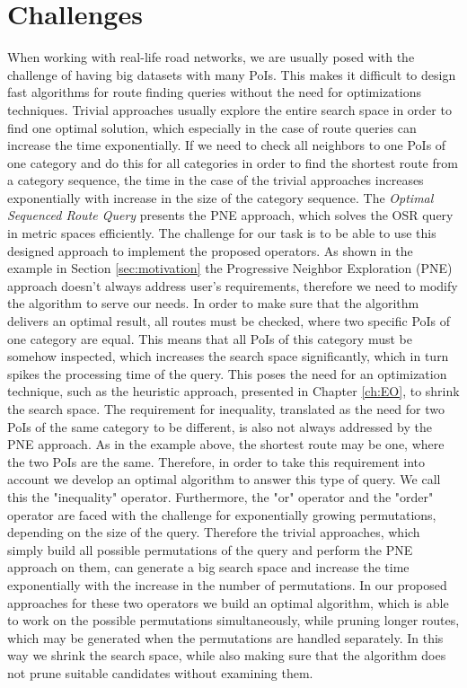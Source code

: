 \section{Challenges}
When working with real-life road networks, we are usually posed with the challenge of having big datasets with many PoIs. This makes it difficult to design fast algorithms for route finding queries without the need for optimizations techniques. Trivial approaches usually explore the entire search space in order to find one optimal solution, which especially in the case of route queries can increase the time exponentially. If we need to check all neighbors to one PoIs of one category and do this for all categories in order to find the shortest route from a category sequence, the time in the case of the trivial approaches increases exponentially with increase in the size of the category sequence. The \textit{Optimal Sequenced Route Query} \cite{OSR} presents the PNE approach, which solves the OSR query in metric spaces efficiently. The challenge for our task is to be able to use this designed approach to implement the proposed operators. \newline
As shown in the example in Section \ref{sec:motivation} the Progressive Neighbor Exploration (PNE) approach doesn't always address user's requirements, therefore we need to modify the algorithm to serve our needs. In order to make sure that the algorithm delivers an optimal result, all routes must be checked, where two specific PoIs of one category are equal. This means that all PoIs of this category must be somehow inspected, which increases the search space significantly, which in turn spikes the processing time of the query. This poses the need for an optimization technique, such as the heuristic approach, presented in Chapter \ref{ch:EO}, to shrink the search space. \newline
The requirement for inequality, translated as the need for two PoIs of the same category to be different, is also not always addressed by the PNE approach. As in the example above, the shortest route may be one, where the two PoIs are the same. Therefore, in order to take this requirement into account we develop an optimal algorithm to answer this type of query. We call this the "inequality" operator. \newline
Furthermore, the "or" operator and the "order" operator are faced with the challenge for exponentially growing permutations, depending on the size of the query. Therefore the trivial approaches, which simply build all possible permutations of the query and perform the PNE approach on them, can generate a big search space and increase the time exponentially with the increase in the number of permutations. In our proposed approaches for these two operators we build an optimal algorithm, which is able to work on the possible permutations simultaneously, while pruning longer routes, which may be generated when the permutations are handled separately. In this way we shrink the search space, while also making sure that the algorithm does not prune suitable candidates without examining them.

